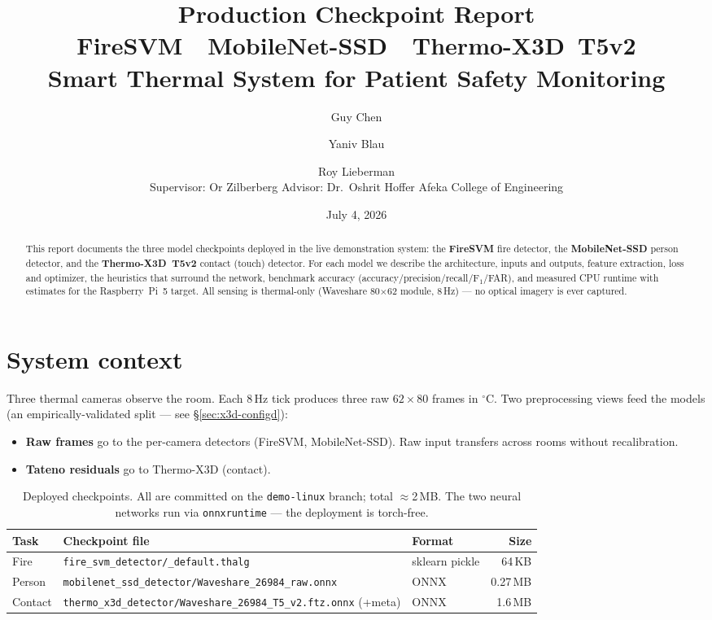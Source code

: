\documentclass[11pt]{article}
\title{\bfseries Production Checkpoint Report\\
\large FireSVM \,\textperiodcentered\, MobileNet-SSD \,\textperiodcentered\, Thermo-X3D~T5v2\\
\normalsize Smart Thermal System for Patient Safety Monitoring}
\author{Guy Chen \and Yaniv Blau \and Roy Lieberman\\
\small Supervisor: Or Zilberberg \quad Advisor: Dr.\ Oshrit Hoffer \quad Afeka College of Engineering}
\date{July 4, 2026}
\newcommand{\code}[1]{\texttt{\small #1}}
\begin{document}
\maketitle

\begin{abstract}
\noindent This report documents the three model checkpoints deployed in the live
demonstration system: the \textbf{FireSVM} fire detector, the
\textbf{MobileNet-SSD} person detector, and the \textbf{Thermo-X3D~T5v2}
contact (touch) detector. For each model we describe the architecture,
inputs and outputs, feature extraction, loss and optimizer, the heuristics
that surround the network, benchmark accuracy
(accuracy/precision/recall/F$_1$/FAR), and measured CPU runtime with
estimates for the Raspberry~Pi~5 target. All sensing is thermal-only
(Waveshare 80$\times$62 module, 8\,Hz) --- no optical imagery is ever captured.
\end{abstract}

\section{System context}

Three thermal cameras observe the room. Each 8\,Hz tick produces three raw
$62\times80$ frames in $^\circ$C. Two preprocessing views feed the models
(an empirically-validated split --- see \S\ref{sec:x3d-configd}):

\begin{itemize}
\item \textbf{Raw frames} go to the per-camera detectors (FireSVM,
      MobileNet-SSD). Raw input transfers across rooms without recalibration.
\item \textbf{Tateno residuals} go to Thermo-X3D (contact).
\end{itemize}

\begin{table}[H]\centering\small
\begin{tabular}{lllr}
\toprule
Task & Checkpoint file & Format & Size\\
\midrule
Fire      & \code{fire\_svm\_detector/\_default.thalg} & sklearn pickle & 64\,KB\\
Person    & \code{mobilenet\_ssd\_detector/Waveshare\_26984\_raw.onnx} & ONNX & 0.27\,MB\\
Contact   & \code{thermo\_x3d\_detector/Waveshare\_26984\_T5\_v2.ftz.onnx} (+meta) & ONNX & 1.6\,MB\\
\bottomrule
\end{tabular}
\caption{Deployed checkpoints. All are committed on the \code{demo-linux}
branch; total $\approx$2\,MB. The two neural networks run via
\code{onnxruntime} --- the deployment is torch-free.}
\end{table}
\end{document}
